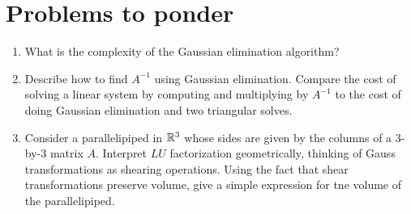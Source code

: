 \documentclass[12pt, leqno]{article}
\begin{document}
\newpage

\section{Problems to ponder}

\begin{enumerate}
\item
  What is the complexity of the Gaussian elimination algorithm?
\item
  Describe how to find $A^{-1}$ using Gaussian elimination.  Compare
  the cost of solving a linear system by computing and multiplying by
  $A^{-1}$ to the cost of doing Gaussian elimination and two
  triangular solves.
\item
  Consider a parallelipiped in $\mathbb{R}^{3}$ whose sides are given by
  the columns of a 3-by-3 matrix $A$.  Interpret $LU$ factorization
  geometrically, thinking of Gauss transformations as shearing
  operations.  Using the fact that shear transformations preserve
  volume, give a simple expression for tne volume of the parallelipiped.
\end{enumerate}
\end{document}
